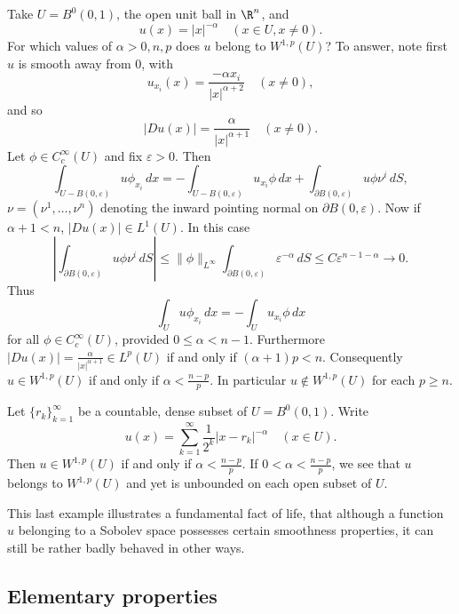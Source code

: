 \begin{example}
\label{ex:power-singularity-sobolev-membership}
Take $U = B^0(0,1)$, the open unit ball in $\R^n$, and
$$u(x) = |x|^{-\alpha} \quad (x \in U, x \ne 0).$$
For which values of $\alpha > 0, n, p$ does $u$ belong to $W^{1,p}(U)$? To answer, note first $u$ is smooth away from $0$, with
$$u_{x_i}(x) = \frac{-\alpha x_i}{|x|^{\alpha+2}} \quad (x \ne 0),$$
and so
$$|Du(x)| = \frac{\alpha}{|x|^{\alpha+1}} \quad (x \ne 0).$$
Let $\phi \in C_c^\infty(U)$ and fix $\varepsilon > 0$. Then
$$\int_{U - B(0,\varepsilon)} u\phi_{x_i}\,dx = -\int_{U - B(0,\varepsilon)} u_{x_i}\phi\,dx + \int_{\partial B(0,\varepsilon)} u\phi\nu^i\,dS,$$
$\nu = (\nu^1, \ldots, \nu^n)$ denoting the inward pointing normal on $\partial B(0,\varepsilon)$. Now if $\alpha + 1 < n$, $|Du(x)| \in L^1(U)$. In this case
$$\left|\int_{\partial B(0,\varepsilon)} u\phi\nu^i\,dS\right| \le \|\phi\|_{L^\infty} \int_{\partial B(0,\varepsilon)} \varepsilon^{-\alpha}\,dS \le C\varepsilon^{n-1-\alpha} \to 0.$$
Thus
$$\int_U u\phi_{x_i}\,dx = -\int_U u_{x_i}\phi\,dx$$
for all $\phi \in C_c^\infty(U)$, provided $0 \le \alpha < n - 1$. Furthermore $|Du(x)| = \frac{\alpha}{|x|^{\alpha+1}} \in L^p(U)$ if and only if $(\alpha+1)p < n$. Consequently $u \in W^{1,p}(U)$ if and only if $\alpha < \frac{n-p}{p}$. In particular $u \notin W^{1,p}(U)$ for each $p \ge n$.
\end{example}

\begin{example}
\label{ex:dense-singularities-unbounded-sobolev}
Let $\{r_k\}_{k=1}^{\infty}$ be a countable, dense subset of $U = B^0(0,1)$. Write
$$u(x) = \sum_{k=1}^{\infty} \frac{1}{2^k} |x - r_k|^{-\alpha} \quad (x \in U).$$
Then $u \in W^{1,p}(U)$ if and only if $\alpha < \frac{n-p}{p}$. If $0 < \alpha < \frac{n-p}{p}$, we see that $u$ belongs to $W^{1,p}(U)$ and yet is unbounded on each open subset of $U$.
\end{example}

This last example illustrates a fundamental fact of life, that although a function $u$ belonging to a Sobolev space possesses certain smoothness properties, it can still be rather badly behaved in other ways.

\subsection{Elementary properties}

